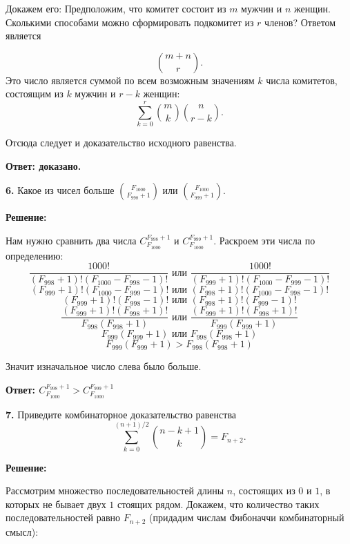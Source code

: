 \documentclass[a4paper,12pt]{article} %
\begin{document}
Докажем его: Предположим, что комитет состоит из $m$ мужчин и $n$ женщин. Сколькими способами можно сформировать подкомитет из $r$ членов? Ответом является

\[{ {m+n \choose r}.}\]
Это число является суммой по всем возможным значениям $k$ числа комитетов, состоящим из $k$ мужчин и $r-k$ женщин: \[ {\sum _{k=0}^{r}{m \choose k}{n \choose r-k}.}\]

Отсюда следует и доказательство исходного равенства.
	
	
\begin{flushright}
\begin{large}
\textbf {Ответ: доказано.}
\end{large}
\end{flushright}

{\bf 6.} Какое из чисел больше ${{F_{1000} \choose F_{998} + 1}}$ или ${{F_{1000} \choose F_{999} + 1}}$.
\begin{center}
\bfseries
{\Large Решение: }
\end{center}

Нам нужно сравнить два числа $C_{F_{1000}}^{F_{998} + 1}$ и $C_{F_{1000}}^{F_{999} + 1}$. Раскроем эти числа по определению:
\[\frac{1000!}{(F_{998} + 1)!(F_{1000} - F_{998} - 1)!} \text{ или } \frac{1000!}{(F_{999} + 1)!(F_{1000} - F_{999} - 1)!}\]
\[(F_{999} + 1)!(F_{1000} - F_{999} - 1)! \text{ или } (F_{998} + 1)!(F_{1000} - F_{998} - 1)!\]
\[(F_{999} + 1)!(F_{998} - 1)! \text{ или } (F_{998} + 1)!(F_{999} - 1)!\]
\[\frac{(F_{999} + 1)!(F_{998} + 1)!}{F_{998}(F_{998} + 1)} \text{ или } \frac{(F_{999} + 1)!(F_{998} + 1)!}{F_{999}(F_{999} + 1)}\]
\[F_{999}(F_{999} + 1) \text{ или } F_{998}(F_{998} + 1)\]
\[F_{999}(F_{999} + 1) > F_{998}(F_{998} + 1)\]

Значит изначальное число слева было больше.


\begin{flushright}
\begin{large}
\textbf {Ответ: $C_{F_{1000}}^{F_{998} + 1} > C_{F_{1000}}^{F_{999} + 1}$}
\end{large}
\end{flushright}

{\bf 7.} Приведите комбинаторное доказательство равенства \[ \sum\limits_{k = 0}^{(n+1)/2} {{n-k+1 \choose k}} = F_{n+2} .\]
\begin{center}
\bfseries
{\Large Решение: }
\end{center}

Рассмотрим множество последовательностей длины $n$, состоящих из $0$ и $1$, в которых не бывает двух $1$ стоящих рядом. Докажем, что количество таких последовательностей равно $F_{n + 2}$ (придадим числам Фибоначчи
комбинаторный смысл): 
\end{document}
